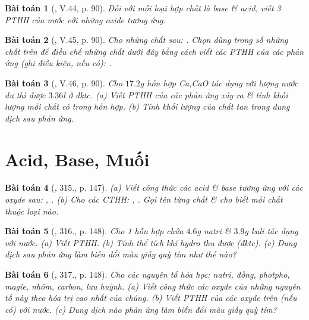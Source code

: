 \documentclass{article}
\newtheorem{baitoan}{Bài toán}
\begin{document}
\begin{baitoan}[\cite{Truong_BTNC_Hoa_Hoc_8_2022}, V.44, p. 90]
	Đối với mỗi loại hợp chất là base \& acid, viết 3 PTHH của nước với những oxide tương ứng.
\end{baitoan}

\begin{baitoan}[\cite{Truong_BTNC_Hoa_Hoc_8_2022}, V.45, p. 90]
	Cho những chất sau: \emph{}. Chọn dùng trong số những chất trên để điều chế những chất dưới đây bằng cách viết các PTHH của các phản ứng (ghi điều kiện, nếu có): \emph{}.
\end{baitoan}

\begin{baitoan}[\cite{Truong_BTNC_Hoa_Hoc_8_2022}, V.46, p. 90]
	Cho $17.2$\emph{g} hỗn hợp \emph{Ca,CaO} tác dụng với lượng nước dư thì được $3.36$\emph{l } ở đktc. (a) Viết PTHH của các phản ứng xảy ra \& tính khối lượng mỗi chất có trong hỗn hợp. (b) Tính khối lượng của chất tan trong dung dịch sau phản ứng.
\end{baitoan}


\section{Acid, Base, Muối}

\begin{baitoan}[\cite{An_400_BT_Hoa_Hoc_8_2020}, 315., p. 147]
	(a) Viết công thức các acid \& base tương ứng với các oxyde sau: \emph{, }. (b) Cho các CTHH: \emph{, }. Gọi tên từng chất \& cho biết mỗi chất thuộc loại nào.
\end{baitoan}

\begin{baitoan}[\cite{An_400_BT_Hoa_Hoc_8_2020}, 316., p. 148]
	Cho 1 hỗn hợp chứa $4.6$\emph{g} natri \& $3.9$\emph{g} kali tác dụng với nước. (a) Viết PTHH. (b) Tính thể tích khí hydro thu được (đktc). (c) Dung dịch sau phản ứng làm biến đổi màu giấy quỳ tím như thế nào?
\end{baitoan}

\begin{baitoan}[\cite{An_400_BT_Hoa_Hoc_8_2020}, 317., p. 148]
	Cho các nguyên tố hóa học: natri, đồng, photpho, magie, nhôm, carbon, lưu huỳnh. (a) Viết công thức các oxyde của những nguyên tố này theo hóa trị cao nhất của chúng. (b) Viết PTHH của các oxyde trên (nếu có) với nước. (c) Dung dịch nào phản ứng làm biến đổi màu giấy quỳ tím?
\end{baitoan}
\end{document}

